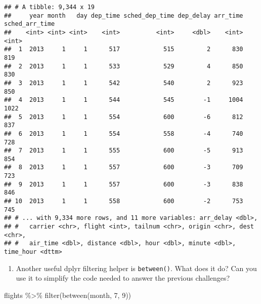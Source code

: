 \documentclass[
]{article}
\newenvironment{Shaded}{\begin{snugshade}}{\end{snugshade}}
\newcommand{\DecValTok}[1]{\textcolor[rgb]{0.00,0.00,0.81}{#1}}
\newcommand{\FunctionTok}[1]{\textcolor[rgb]{0.00,0.00,0.00}{#1}}
\newcommand{\NormalTok}[1]{#1}
\newcommand{\SpecialCharTok}[1]{\textcolor[rgb]{0.00,0.00,0.00}{#1}}
\providecommand{\tightlist}{%
  \setlength{\itemsep}{0pt}\setlength{\parskip}{0pt}}
\begin{document}
\begin{verbatim}
## # A tibble: 9,344 x 19
##     year month   day dep_time sched_dep_time dep_delay arr_time sched_arr_time
##    <int> <int> <int>    <int>          <int>     <dbl>    <int>          <int>
##  1  2013     1     1      517            515         2      830            819
##  2  2013     1     1      533            529         4      850            830
##  3  2013     1     1      542            540         2      923            850
##  4  2013     1     1      544            545        -1     1004           1022
##  5  2013     1     1      554            600        -6      812            837
##  6  2013     1     1      554            558        -4      740            728
##  7  2013     1     1      555            600        -5      913            854
##  8  2013     1     1      557            600        -3      709            723
##  9  2013     1     1      557            600        -3      838            846
## 10  2013     1     1      558            600        -2      753            745
## # ... with 9,334 more rows, and 11 more variables: arr_delay <dbl>,
## #   carrier <chr>, flight <int>, tailnum <chr>, origin <chr>, dest <chr>,
## #   air_time <dbl>, distance <dbl>, hour <dbl>, minute <dbl>, time_hour <dttm>
\end{verbatim}

\begin{enumerate}
\def\labelenumi{\arabic{enumi}.}
\setcounter{enumi}{1}
\tightlist
\item
  Another useful dplyr filtering helper is \texttt{between()}. What does
  it do? Can you use it to simplify the code needed to answer the
  previous challenges?
\end{enumerate}

\begin{Shaded}
\begin{Highlighting}[]
\NormalTok{flights }\SpecialCharTok{\%\textgreater{}\%} \FunctionTok{filter}\NormalTok{(}\FunctionTok{between}\NormalTok{(month, }\DecValTok{7}\NormalTok{, }\DecValTok{9}\NormalTok{))}
\end{Highlighting}
\end{Shaded}
\end{document}
